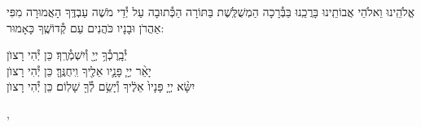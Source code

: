 \documentclass[twoside, openany, parskip=half, 11pt]{book}
\begin{document}

\weekdaysakedusha

\vspace{\baselineskip}
\sepline


\weekdaysabinah

\weekdaysateshuva

\weekdaysaselichah

\weekdaysageulah

\weekdaysaanneinu

\weekdaysarefuah

\weekdaysaberacha

\enlargethispage{\baselineskip}

\weekdaysashofar

\weekdaysamishpat

\weekdaysaminim

\weekdaysatzadikim

\weekdaysayerushelayim

\weekdaysamalchus

\weekdaysashemakoleinu

\retzeh

\yaalehveyavo

\enlargethispage{\baselineskip}

\zion

\modim

\alhanisim

\weekdaysahodos


אֱלֹהֵֽינוּ וֵאלֹהֵי אֲבוֹתֵֽינוּ בָּרֲכֵֽנוּ בַּבְּ֯רָכָה הַמְשֻׁלֶּֽשֶׁת בַּתּוֹרָה
הַכְּ֯תוּבָה עַל יְ֯דֵי מֹשֶׁה עַבְדֶּֽךָ הָאֲמוּרָה מִפִּי אַהֲרֹן וּבָנָיו כֹּהֲנִים עַם קְ֯דוֹשֶֽׁךָ כָּאָמוּר:

יְ֯בָֽרֶכְ֯ךָ֥ יְיָ֖ וְ֯יִשְׁמְ֯רֶֽךָ׃ \hfill \kahal כֵּן יְ֯הִי רָצוׂן \\
יָאֵ֨ר יְיָ֧ פָּנָ֛יו אֵלֶ֖יךָ וִֽיחֻנֶּֽךָּ׃ \hfill \kahal כֵּן יְ֯הִי רָצוׂן \\
יִשָּׂ֨א יְיָ֤ פָּנָיו֙ אֵלֶ֔יךָ וְ֯יָשֵׂ֥ם לְ֯ךָ֖ שָׁלֽוֹם׃ \hfill \kahal כֵּן יְ֯הִי רָצוׂן

\simshalom{\ayt}

\tachanunim

\enlargethispage{\baselineskip}

,
\\
\\
\\
\\
\end{document}

